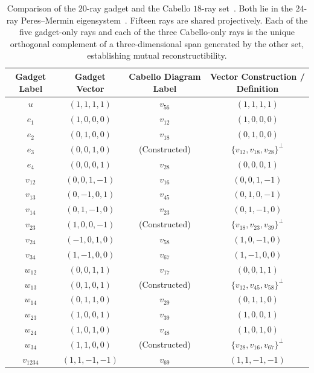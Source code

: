 \documentclass[%
  reprint,
  superscriptaddress,
  showpacs,
  showkeys,
  amsmath,amssymb,
  pra,
  longbibliography,
  floatfix,
  x11names
]{revtex4-2}
\newcommand{\rev}[1]{{#1}}
\begin{document}
\begin{table}[ht]
\caption{\rev{Comparison of the $20$-ray gadget and the Cabello $18$-ray set~\cite{cabello-96,cabello:210401}.  Both lie in the $24$-ray Peres--Mermin eigensystem~\cite{peres111,mermin90b,peres-91,pavicic-2004ksafq,svozil-2024-convert-pra-externalfigures}.  Fifteen rays are shared projectively.  Each of the five gadget-only rays and each of the three Cabello-only rays is the unique orthogonal complement of a three-dimensional span generated by the other set, establishing mutual reconstructibility.}}
\label{tab:vector-equivalence}
\begin{ruledtabular}
\begin{tabular}{cccc}
Gadget Label & Gadget Vector & Cabello Diagram Label & Vector Construction / Definition \\
\hline
$u$ & $(1,1,1,1)$ & $v_{56}$ & $(1,1,1,1)$ \\
$e_1$ & $(1,0,0,0)$ & $v_{12}$ & $(1,0,0,0)$ \\
$e_2$ & $(0,1,0,0)$ & $v_{18}$ & $(0,1,0,0)$ \\
$e_3$ & $(0,0,1,0)$ & (Constructed) & $\{v_{12}, v_{18}, v_{28}\}^\perp$ \\
$e_4$ & $(0,0,0,1)$ & $v_{28}$ & $(0,0,0,1)$ \\
\hline
$v_{12}$ & $(0,0,1,-1)$ & $v_{16}$ & $(0,0,1,-1)$ \\
$v_{13}$ & $(0,-1,0,1)$ & $v_{45}$ & $(0,1,0,-1)$ \\
$v_{14}$ & $(0,1,-1,0)$ & $v_{23}$ & $(0,1,-1,0)$ \\
$v_{23}$ & $(1,0,0,-1)$ & \rev{(Constructed)} & \rev{$\{v_{18},v_{23},v_{39}\}^\perp$} \\
$v_{24}$ & $(-1,0,1,0)$ & $v_{58}$ & $(1,0,-1,0)$ \\
$v_{34}$ & $(1,-1,0,0)$ & $v_{67}$ & $(1,-1,0,0)$ \\
\hline
$w_{12}$ & $(0,0,1,1)$ & $v_{17}$ & $(0,0,1,1)$ \\
$w_{13}$ & $(0,1,0,1)$ & \rev{(Constructed)} & \rev{$\{v_{12},v_{45},v_{58}\}^\perp$} \\
$w_{14}$ & $(0,1,1,0)$ & $v_{29}$ & $(0,1,1,0)$ \\
$w_{23}$ & $(1,0,0,1)$ & $v_{39}$ & $(1,0,0,1)$ \\
$w_{24}$ & $(1,0,1,0)$ & $v_{48}$ & $(1,0,1,0)$ \\
$w_{34}$ & $(1,1,0,0)$ & \rev{(Constructed)} & \rev{$\{v_{28},v_{16},v_{67}\}^\perp$} \\
\hline
$v_{1234}$ & $(1,1,-1,-1)$ & $v_{69}$ & $(1,1,-1,-1)$ \\

\end{tabular}
\end{ruledtabular}
\end{table}
\end{document}
